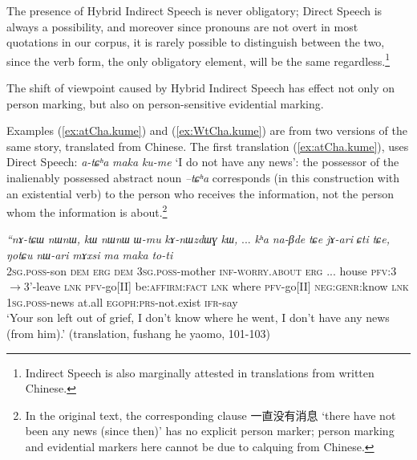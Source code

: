 \documentclass[11pt]{article}
\newcommand{\ipa}[1]{{\phon\textit{#1}}} %
\newcommand{\zh}[1]{{\cn #1}}
\newcommand{\refb}[1]{(\ref{#1})}
\newcommand{\bleu}[1]{{\color{blue}#1}}
\begin{document}
 The presence of Hybrid Indirect Speech is never obligatory; Direct Speech is always a possibility, and moreover since pronouns are not overt in most quotations in our corpus, it is rarely possible to distinguish between the two, since the verb form, the only obligatory element, will be the same regardless.\footnote{Indirect Speech is also marginally attested in translations from written Chinese.}
 
The shift of viewpoint caused by Hybrid Indirect Speech has effect not only on person marking, but also on person-sensitive evidential marking. %

Examples  \refb{ex:atCha.kume} and \refb{ex:WtCha.kume} are from two versions of the same story, translated from Chinese. The first translation \refb{ex:atCha.kume}, uses Direct Speech: \ipa{a-tɕʰa}  \ipa{maka} 	\ipa{ku-me} `I do not have any news': the possessor of the inalienably possessed abstract noun \ipa{--tɕʰa} corresponds (in this construction with an existential verb) to the person who receives the information, not the person whom the information is about.\footnote{In the original text, the corresponding clause \zh{一直没有消息} `there have not been any news (since then)' has no explicit person marker; person marking and evidential markers here cannot be due to calquing from Chinese. }
 

\begin{exe}
\ex \label{ex:atCha.kume}
 \gll %
 \ipa{``nɤ-tɕɯ} 	\ipa{nɯnɯ,} 	\ipa{kɯ} 	\ipa{nɯnɯ} 	\ipa{ɯ-mu} 	\ipa{kɤ-nɯzdɯɣ} 	\ipa{kɯ,} 	... 	\ipa{kʰa} 	\ipa{na-βde} 	\ipa{tɕe} 	 	\ipa{jɤ-ari} 	\ipa{ɕti} 	\ipa{tɕe,} 	\ipa{ŋotɕu} 	\ipa{nɯ-ari} 	\ipa{mɤxsi} 	\ipa{ma} 	\bleu{\ipa{a-tɕʰa}} 	\ipa{maka} 	\bleu{\ipa{ku-me"}} 	\ipa{to-ti}  \\
\textsc{2sg.poss}-son \textsc{dem} \textsc{erg} \textsc{dem} \textsc{3sg.poss}-mother \textsc{inf}-\textsc{worry.about}  \textsc{erg} ... house \textsc{pfv}:3$\rightarrow$3'-leave \textsc{lnk} \textsc{pfv}-go[II] be:\textsc{affirm:fact} \textsc{lnk} where \textsc{pfv}-go[II] \textsc{neg:genr}:know \textsc{lnk} \bleu{\textsc{1sg.poss}-news} at.all \bleu{\textsc{egoph:prs}-not.exist} \textsc{ifr}-say \\
\glt `Your son left out of grief, I don't know where he went, I don't have any news (from him).' (translation, fushang he yaomo, 101-103)
\end{exe}
\end{document}
